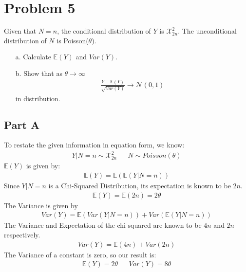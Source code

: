 \documentclass{article}
\begin{document}
\section*{Problem 5}
Given that $N=n$, the conditional distribution of $Y$ is $\mathcal{X}^2_{2n}$. The unconditional distribution of $N$ is Poisson($\theta$).
\begin{enumerate}
\item[a.] Calculate $\mathbb{E}(Y)$ and $Var(Y)$.
\item[b.] Show that as $\theta \rightarrow \infty$ 
\begin{align*}
\frac{Y-\mathbb{E}(Y)}{\sqrt{Var(Y)}} \rightarrow \mathcal{N}(0,1)
\end{align*}
in distribution.
\end{enumerate}
\subsection*{Part A}
To restate the given information in equation form, we know:
\begin{align*}
Y|N=n \sim \mathcal{X}^2_{2n} && N \sim Poisson(\theta)
\end{align*}
$\mathbb{E}(Y)$ is given by:
\begin{align*}
\mathbb{E}(Y) = \mathbb{E}(\mathbb{E}(Y|N=n))
\end{align*}
Since $Y|N=n$ is a Chi-Squared Distribution, its expectation is known to be $2n$.
\begin{align*}
\mathbb{E}(Y) = \mathbb{E}(2n) = 2\theta
\end{align*}
The Variance is given by
\begin{align*}
Var(Y) = \mathbb{E}(Var(Y|N=n)) + Var(\mathbb{E}(Y|N=n))
\end{align*}
The Variance and Expectation of the chi squared are known to be $4n$ and $2n$ respectively.
\begin{align*}
Var(Y) = \mathbb{E}(4n) + Var(2n)
\end{align*}
The Variance of a constant is zero, so our result is:
\begin{align*}
\boxed{ \mathbb{E}(Y) = 2\theta } && \boxed{ Var(Y) = 8\theta }
\end{align*}
\end{document}
